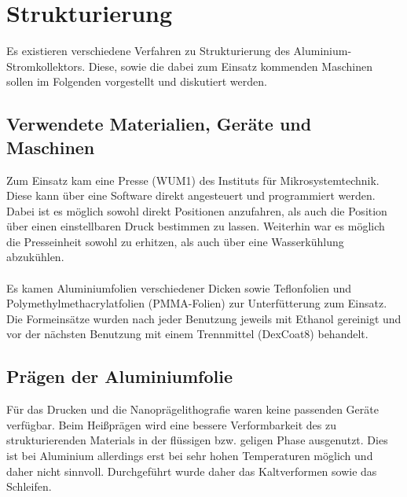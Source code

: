 \documentclass[a4paper, 11pt, headsepline,footsepline,twoside,abstract]{scrbook}
\begin{document}
\newpage

\chapter{Strukturierung}
Es existieren verschiedene Verfahren zu Strukturierung des Aluminium-Stromkollektors. Diese, sowie die dabei zum Einsatz kommenden Maschinen sollen im Folgenden vorgestellt und diskutiert werden.
\section{Verwendete Materialien, Geräte und Maschinen}
Zum Einsatz kam eine Presse (WUM1) des Instituts für Mikrosystemtechnik. Diese kann über eine Software direkt angesteuert und programmiert werden. Dabei ist es möglich sowohl direkt Positionen anzufahren, als auch die Position über einen einstellbaren Druck bestimmen zu lassen. Weiterhin war es möglich die Presseinheit sowohl zu erhitzen, als auch über eine Wasserkühlung abzukühlen.\\\\
Es kamen Aluminiumfolien verschiedener Dicken sowie Teflonfolien und Polymethylmeth\-acrylatfolien (PMMA-Folien) zur Unterfütterung zum Einsatz. Die Formeinsätze wurden nach jeder Benutzung jeweils mit Ethanol gereinigt und vor der nächsten Benutzung mit einem Trennmittel (DexCoat8) behandelt.
\section{Prägen der Aluminiumfolie}
Für das Drucken und die Nanoprägelithografie waren keine passenden Geräte verfügbar. Beim Heißprägen wird eine bessere Verformbarkeit des zu strukturierenden Materials in der flüssigen bzw. geligen Phase ausgenutzt. Dies ist bei Aluminium allerdings erst bei sehr hohen Temperaturen möglich und daher nicht sinnvoll. Durchgeführt wurde daher das Kaltverformen sowie das Schleifen.
\end{document}
